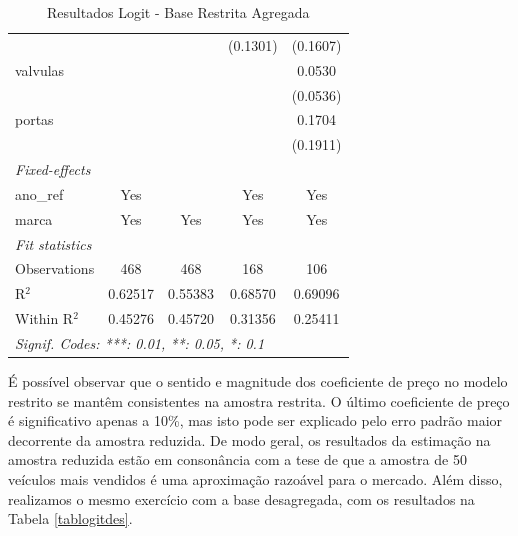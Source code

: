 \documentclass{article}
\begin{document}
\begin{table}[H]
\begin{tabular}{lcccc}
                 &                                &                                & (0.1301)                      & (0.1607)\\   
   valvulas      &                                &                                &                               & 0.0530\\   
                 &                                &                                &                               & (0.0536)\\   
   portas        &                                &                                &                               & 0.1704\\   
                 &                                &                                &                               & (0.1911)\\   
   \midrule
   \emph{Fixed-effects}\\
   ano\_ref      & Yes                            &                                & Yes                           & Yes\\  
   marca         & Yes                            & Yes                            & Yes                           & Yes\\  
   \midrule
   \emph{Fit statistics}\\
   Observations  & 468                            & 468                            & 168                           & 106\\  
   R$^2$         & 0.62517                        & 0.55383                        & 0.68570                       & 0.69096\\  
   Within R$^2$  & 0.45276                        & 0.45720                        & 0.31356                       & 0.25411\\  
   \midrule \midrule
   \multicolumn{5}{l}{\emph{Signif. Codes: ***: 0.01, **: 0.05, *: 0.1}}\\
\end{tabular}
\par\endgroup
    \caption{Resultados Logit - Base Restrita Agregada}
    \label{tablogitrest}
\end{table}

É possível observar que o sentido e magnitude dos coeficiente de preço no modelo restrito se mantêm consistentes na amostra restrita. O último coeficiente de preço é significativo apenas a 10\%, mas isto pode ser explicado pelo erro padrão maior decorrente da amostra reduzida. De modo geral, os resultados da estimação na amostra reduzida estão em consonância com a tese de que a amostra de 50 veículos mais vendidos é uma aproximação razoável para o mercado. Além disso, realizamos o mesmo exercício com a base desagregada, com os resultados na Tabela \ref{tablogitdes}.
\end{document}
